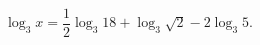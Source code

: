 \begin{ex}[type=equation]
	\begin{condition}
		$\log_3 x = \dfrac{1}{2}\log_3 18 + \log_3\sqrt{2} - 2\log_3 5.$
	\end{condition}
\end{ex}